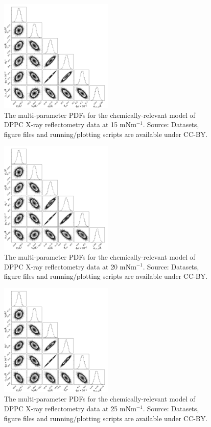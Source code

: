 \documentclass[11pt,a4paper]{article}
\begin{document}
\begin{figure}[h]
	\centering
	\includegraphics[width=0.50\textwidth]{figures/dppc1_all_corner}
	\caption{The multi-parameter PDFs for the chemically-relevant model of DPPC X-ray reflectometry data at 15 mNm$^{-1}$. Source: Datasets, figure files and running/plotting scripts are available under CC-BY.\cite{mccluskey_2018}}
	\label{fig:dppc2}
\end{figure}
\begin{figure}[h]
	\centering
	\includegraphics[width=0.50\textwidth]{figures/dppc2_all_corner}
	\caption{The multi-parameter PDFs for the chemically-relevant model of DPPC X-ray reflectometry data at 20 mNm$^{-1}$. Source: Datasets, figure files and running/plotting scripts are available under CC-BY.\cite{mccluskey_2018}}
	\label{fig:dppc3}
\end{figure}
\begin{figure}[h]
	\centering
	\includegraphics[width=0.50\textwidth]{figures/dppc3_all_corner}
	\caption{The multi-parameter PDFs for the chemically-relevant model of DPPC X-ray reflectometry data at 25 mNm$^{-1}$. Source: Datasets, figure files and running/plotting scripts are available under CC-BY.\cite{mccluskey_2018}}
	\label{fig:dppc4}
\end{figure}
\end{document}
